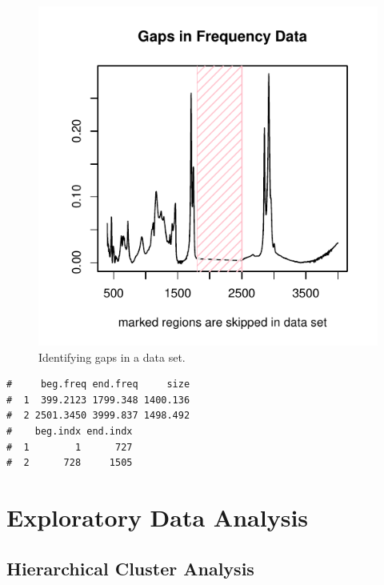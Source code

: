 \documentclass[letter,10pt,twocolumn,twoside,printwatermark=false]{pinp}
\begin{document}
\begin{figure}

{\centering \includegraphics{ChemoSpec2_files/figure-latex/Chunk7-1} 

}

\caption{\label{gaps}Identifying gaps in a data set.}\label{fig:Chunk7}
\end{figure}
\begin{ShadedResult}
\begin{verbatim}
#     beg.freq end.freq     size
#  1  399.2123 1799.348 1400.136
#  2 2501.3450 3999.837 1498.492
#    beg.indx end.indx
#  1        1      727
#  2      728     1505
\end{verbatim}
\end{ShadedResult}

\hypertarget{exploratory-data-analysis}{%
\section{Exploratory Data Analysis}\label{exploratory-data-analysis}}

\hypertarget{hierarchical-cluster-analysis}{%
\subsection{Hierarchical Cluster
Analysis}\label{hierarchical-cluster-analysis}}
\end{document}
